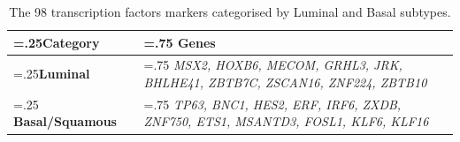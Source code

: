 \begin{table}[!htb]
  \centering
  \small
  \begin{tabularx}{\textwidth}{>{\hsize=.25\hsize}X|>{\hsize=.75\hsize}X}
    \toprule
    \textbf{Category} & \textbf{Genes} \\
    \midrule
    \textbf{Luminal} & \textit{MSX2, HOXB6, MECOM, GRHL3, JRK, BHLHE41, ZBTB7C, ZSCAN16, ZNF224, ZBTB10} \\
    \midrule
    \textbf{Basal/Squamous} & \textit{TP63, BNC1, HES2, ERF, IRF6, ZXDB, ZNF750, ETS1, MSANTD3, FOSL1, KLF6, KLF16} \\
    \bottomrule
  \end{tabularx}
  \caption{The 98 transcription factors markers categorised by Luminal and Basal subtypes.} %
  \label{tab:N_I:genes_lum_basal}
\end{table}


